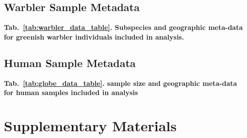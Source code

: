 \documentclass[10pt,letterpaper]{article}
\begin{document}
\subsection*{Warbler Sample Metadata}
\label{warbler_data_table}
{\bf{Tab.\ \ref{tab:warbler_data_table}. Subspecies and geographic meta-data for greenish warbler individuals included in analysis.}}

\subsection*{Human Sample Metadata}
\label{globe_data_table}
{\bf{Tab.\ \ref{tab:globe_data_table}. sample size and geographic meta-data for human samples included in analysis}}

\newpage
\section*{Supplementary Materials}
\renewcommand{\thefigure}{S\arabic{figure}}
\setcounter{figure}{0}
\renewcommand{\thetable}{S\arabic{table}}
\setcounter{table}{0}
\renewcommand{\theequation}{S\arabic{table}}
\setcounter{equation}{0}

\setlength{\textwidth}{450pt}
\setlength{\oddsidemargin}{10pt}
\setlength{\evensidemargin}{10pt}
\lhead{}
\end{document}
